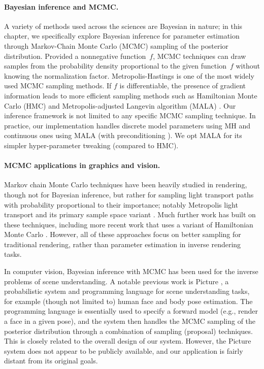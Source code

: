 \paragraph{Bayesian inference and MCMC.} A variety of methods used across the sciences are Bayesian in nature; in this chapter, we specifically explore Bayesian inference for parameter estimation through Markov-Chain Monte Carlo (MCMC) sampling of the posterior distribution. Provided a nonnegative function~$f$, MCMC techniques can draw samples from the probability density proportional to the given function~$f$ without knowing the normalization factor. Metropolis-Hastings \cite{hastings1970monte} is one of the most widely used MCMC sampling methods. If $f$ is differentiable, the presence of gradient information leads to more efficient sampling methods such as Hamiltonian Monte Carlo (HMC) \cite{neal2011mcmc,betancourt2017conceptual} and Metropolis-adjusted Langevin algorithm (MALA) \cite{roberts1996exponential}.
Our inference framework is not limited to any specific MCMC sampling technique.
In practice, our implementation handles discrete model parameters using MH and continuous ones using MALA (with preconditioning \cite{chen2016bridging}). We opt MALA for its simpler hyper-parameter tweaking (compared to HMC).

\paragraph{MCMC applications in graphics and vision.} Markov chain Monte Carlo techniques have been heavily studied in rendering, though not for Bayesian inference, but rather for sampling light transport paths with probability proportional to their importance; notably Metropolis light transport \cite{veach1997metropolis} and its primary sample space variant \cite{kelemen2002simple}. Much further work has built on these techniques, including more recent work that uses a variant of Hamiltonian Monte Carlo \cite{li2015anisotropic}. However, all of these approaches focus on better sampling for traditional rendering, rather than parameter estimation in inverse rendering tasks.

In computer vision, Bayesian inference with MCMC has been used for the inverse problems of scene understanding. A notable previous work is Picture \cite{kulkarni2015picture}, a probabilistic system and programming language for scene understanding tasks, for example (though not limited to) human face and body pose estimation. The programming language is essentially used to specify a forward model (e.g., render a face in a given pose), and the system then handles the MCMC sampling of the posterior distribution through a combination of sampling (proposal) techniques. This is closely related to the overall design of our system. However, the Picture system does not appear to be publicly available, and our application is fairly distant from its original goals.

